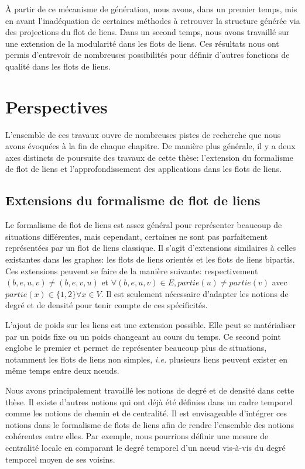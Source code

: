 \`A partir de ce mécanisme de génération, nous avons, dans un premier temps, mis en avant l'inadéquation de certaines méthodes à retrouver la structure générée via des projections du flot de liens.
Dans un second temps, nous avons travaillé sur une extension de la modularité dans les flots de liens.
Ces résultats nous ont permis d'entrevoir de nombreuses possibilités pour définir d'autres fonctions de qualité dans les flots de liens.

\section{Perspectives}

L'ensemble de ces travaux ouvre de nombreuses pistes de recherche que nous avons évoquées à la fin de chaque chapitre.
De manière plus générale, il y a deux axes distincts de poursuite des travaux de cette thèse: l'extension du formalisme de flot de liens et l'approfondissement des applications dans les flots de liens.

\subsection{Extensions du formalisme de flot de liens}

Le formalisme de flot de liens est assez général pour représenter beaucoup de situations différentes, mais cependant, certaines ne sont pas parfaitement représentées par un flot de liens classique.
Il s'agit d'extensions similaires à celles existantes dans les graphes: les flots de liens orientés et les flots de liens bipartis.
Ces extensions peuvent se faire de la manière suivante: respectivement $(b,e,u,v)\neq (b,e,v,u)$ et $\forall (b,e,u,v) \in E, partie(u)\neq partie(v)$ avec $partie(x) \in \{1,2\} \forall x \in V$.
Il est seulement nécessaire d'adapter les notions de degré et de densité pour tenir compte de ces spécificités.

\bigskip

L'ajout de poids sur les liens est une extension possible.
Elle peut se matérialiser par un poids fixe ou un poids changeant au cours du temps.
Ce second point englobe le premier et permet de représenter beaucoup plus de situations, notamment les flots de liens non simples, \emph{i.e.} plusieurs liens peuvent exister en même temps entre deux n\oe{}uds.

\bigskip

Nous avons principalement travaillé les notions de degré et de densité dans cette thèse.
Il existe d'autres notions qui ont déjà été définies dans un cadre temporel comme les notions de chemin et de centralité.
Il est envisageable d'intégrer ces notions dans le formalisme de flots de liens afin de rendre l'ensemble des notions cohérentes entre elles.
Par exemple, nous pourrions définir une mesure de centralité locale en comparant le degré temporel d'un n\oe{}ud vis-à-vis du degré temporel moyen de ses voisins.

